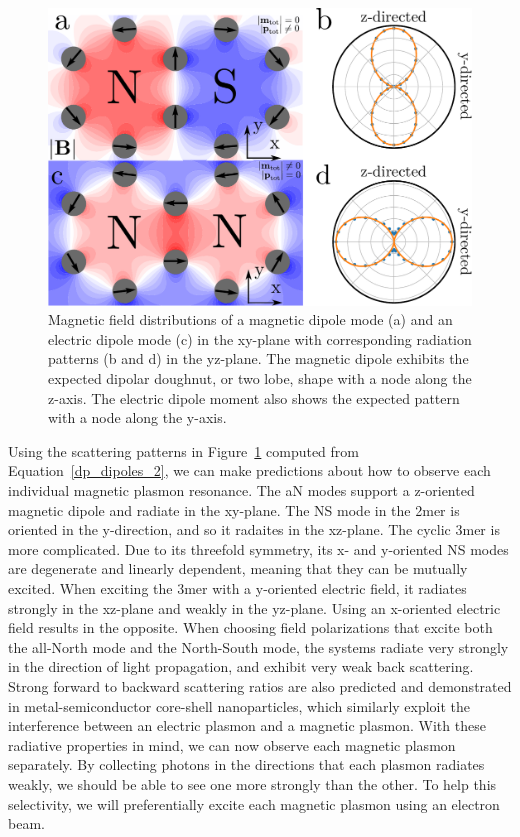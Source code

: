 \documentclass[journal=apchd5,manuscript=article]{achemso}
\begin{document}
\begin{figure}
\includegraphics[width=5in]{scattering_patterns.pdf}
\caption{Magnetic field distributions of a magnetic dipole mode (a) and an electric dipole mode (c) in the xy-plane with corresponding radiation patterns (b and d) in the yz-plane. The magnetic dipole exhibits the expected dipolar doughnut, or two lobe, shape with a node along the z-axis. The electric dipole moment also shows the expected pattern with a node along the y-axis.}
\label{scattering}
\end{figure}

Using the scattering patterns in Figure~\ref{scattering} computed from Equation~\ref{dp_dipoles_2}, we can make predictions about how to observe each individual magnetic plasmon resonance. The aN modes support a z-oriented magnetic dipole and radiate in the xy-plane. The NS mode in the 2mer is oriented in the y-direction, and so it radaites in the xz-plane. The cyclic 3mer is more complicated. Due to its threefold symmetry, its x- and y-oriented NS modes are degenerate and linearly dependent, meaning that they can be mutually excited. When exciting the 3mer with a y-oriented electric field, it radiates strongly in the xz-plane and weakly in the yz-plane. Using an x-oriented electric field results in the opposite. When choosing field polarizations that excite both the all-North mode and the North-South mode, the systems radiate very strongly in the direction of light propagation, and exhibit very weak back scattering. Strong forward to backward scattering ratios are also predicted and demonstrated in metal-semiconductor core-shell nanoparticles, which similarly exploit the interference between an electric plasmon and a magnetic plasmon\cite{Kivshar2012}. With these radiative properties in mind, we can now observe each magnetic plasmon separately. By collecting photons in the directions that each plasmon radiates weakly, we should be able to see one more strongly than the other. To help this selectivity, we will preferentially excite each magnetic plasmon using an electron beam.
\end{document}
